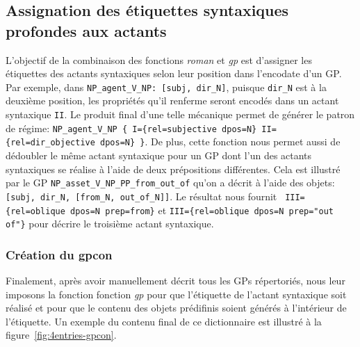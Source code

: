 \subsection{Assignation des étiquettes syntaxiques profondes aux actants}

L'objectif de la combinaison des fonctions \emph{roman} et \emph{gp} est d'assigner les étiquettes des actants syntaxiques selon leur position dans l'encodate d'un \ac{GP}. Par exemple, dans \lstinline|NP_agent_V_NP: [subj, dir_N]|, puisque \texttt{dir\_N} est à la deuxième position, les propriétés qu'il renferme seront encodés dans un actant syntaxique \texttt{II}. Le produit final d'une telle mécanique permet de générer le patron de régime: \lstinline|NP_agent_V_NP { I={rel=subjective dpos=N} II={rel=dir_objective dpos=N} }|. De plus, cette fonction nous permet aussi de dédoubler le même actant syntaxique pour un \ac{GP} dont l'un des actants syntaxiques se réalise à l'aide de deux prépositions différentes. Cela est illustré par le \ac{GP} \lstinline|NP_asset_V_NP_PP_from_out_of| qu'on a décrit à l'aide des objets: \lstinline|[subj, dir_N, [from_N, out_of_N]]|. Le résultat nous fournit \lstinline| III={rel=oblique dpos=N prep=from}| et \lstinline|III={rel=oblique dpos=N prep="out of"}| pour décrire le troisième actant syntaxique. 

\subsubsection{Création du gpcon}
Finalement, après avoir manuellement décrit tous les \acp{GP} répertoriés, nous leur imposons la fonction fonction \emph{gp} pour que l'étiquette de l'actant syntaxique soit réalisé et pour que le contenu des objets prédifinis soient générés à l'intérieur de l'étiquette. Un exemple du contenu final de ce dictionnaire est illustré à la figure~\ref{fig:4entries-gpcon}.

